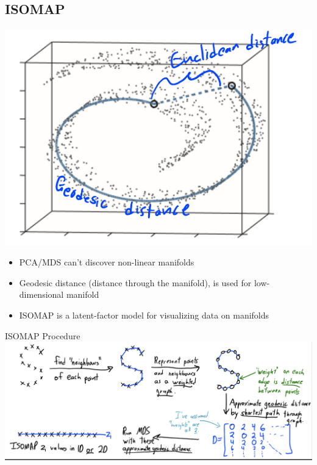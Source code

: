 \documentclass[10pt,landscape,a4paper]{article}
\begin{document}
\begin{multicols*}{5}
\section{ISOMAP}
\begin{center}
    \includegraphics[scale=0.2]{manifold}
\end{center}
\begin{itemize}
    \item PCA/MDS can't discover non-linear manifolds
    \item Geodesic distance (distance through the manifold), is used for low-dimensional manifold
    \item ISOMAP is a latent-factor model for visualizing data on manifolds
\end{itemize}
ISOMAP Procedure \\
\includegraphics[scale=0.12]{isomap_procedure}


\end{multicols*}
\end{document}
